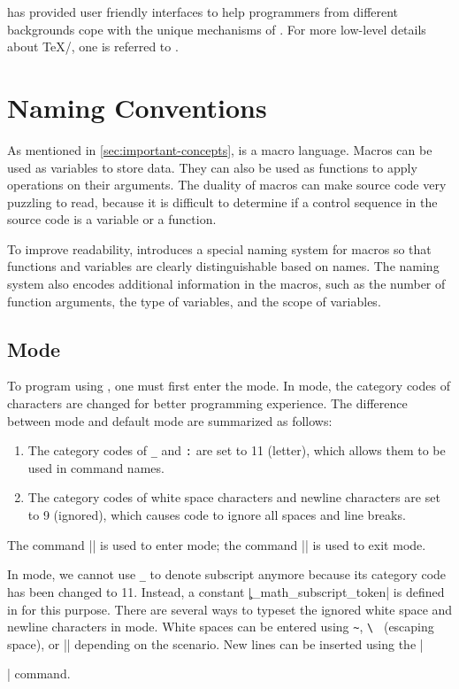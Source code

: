 \documentclass{ltugboat}
\begin{document}
\LTT{} has provided user friendly interfaces to help \LT{} programmers from different backgrounds cope with the unique mechanisms of \LT{}.
For more low-level details about \TeX{}/\LT{}, one is referred to \cite{knuth1984texbook,berry2017latex}.



\section{\LTT{} Naming Conventions}

As mentioned in \cref{sec:important-concepts}, \LT{} is a macro language.
Macros can be used as variables to store data.
They can also be used as functions to apply operations on their arguments.
The duality of macros can make \LT{} source code very puzzling to read, because it is difficult to determine if a control sequence in the source code is a variable or a function.

To improve readability, \LT{} introduces a special naming system for macros so that functions and variables are clearly distinguishable based on names. 
The naming system also encodes additional information in the macros, such as the number of function arguments, the type of variables, and the scope of variables. 


\subsection{\LTT{} Mode}


To program using \LTT{}, one must first enter the \LTT{} mode.
In \LTT{} mode, the category codes of characters are changed for better programming experience.
The difference between \LTT{} mode and default \LT{} mode are summarized as follows:
\begin{enumerate}
    \item The category codes of \verb|_| and \verb|:| are set to 11 (letter), which allows them to be used in command names.
    \item The category codes of white space characters and newline characters are set to 9 (ignored), which causes \LTT{} code to ignore all spaces and line breaks.
\end{enumerate}
The command \inltex|\ExplSyntaxOn| is used to enter \LTT{} mode; the command \inltex|\ExplSyntaxOff| is used to exit \LTT{} mode.

In \LTT{} mode, we cannot use \verb|_| to denote subscript anymore because its category code has been changed to 11. Instead, a constant \inltex|\c_math_subscript_token| is defined in \LTT{} for this purpose.
There are several ways to typeset the ignored white space and newline characters in \LTT{} mode.
White spaces can be entered using \verb|~|, \verb|\ | (escaping space), or \inltex|\space| depending on the scenario.
New lines can be inserted using the \inltex|\par| command.
\end{document}
